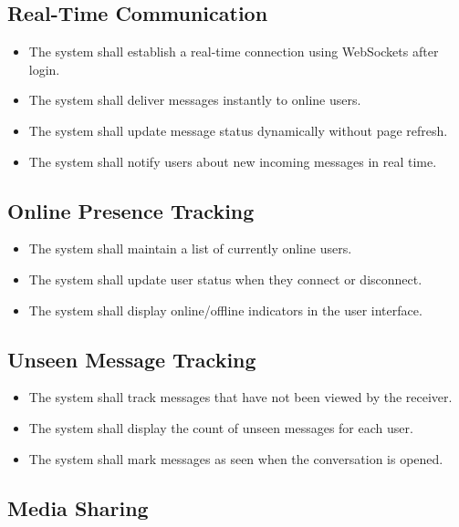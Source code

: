 \documentclass[12pt,a4paper]{report}
\begin{document}
\subsection{Real-Time Communication}

\begin{itemize}
    \item The system shall establish a real-time connection using WebSockets after login.
    \item The system shall deliver messages instantly to online users.
    \item The system shall update message status dynamically without page refresh.
    \item The system shall notify users about new incoming messages in real time.
\end{itemize}

\subsection{Online Presence Tracking}

\begin{itemize}
    \item The system shall maintain a list of currently online users.
    \item The system shall update user status when they connect or disconnect.
    \item The system shall display online/offline indicators in the user interface.
\end{itemize}

\subsection{Unseen Message Tracking}

\begin{itemize}
    \item The system shall track messages that have not been viewed by the receiver.
    \item The system shall display the count of unseen messages for each user.
    \item The system shall mark messages as seen when the conversation is opened.
\end{itemize}

\subsection{Media Sharing}
\end{document}
